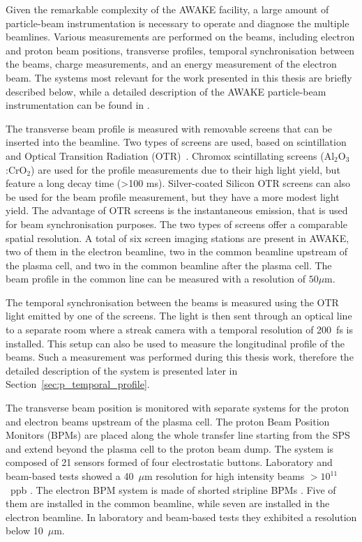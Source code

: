 Given the remarkable complexity of the AWAKE facility, a large amount of particle-beam instrumentation is necessary to operate and diagnose the multiple beamlines. Various measurements are performed on the beams, including electron and proton beam positions, transverse profiles, temporal synchronisation between the beams, charge measurements, and an energy measurement of the electron beam. The systems most relevant for the work presented in this thesis are briefly described below, while a detailed description of the AWAKE particle-beam instrumentation can be found in \cite{Mazzoni:2017gek, Gorgisyan:2649943}. 

The transverse beam profile is measured with removable screens that can be inserted into the beamline. Two types of screens are used, based on   scintillation~\cite{Behrens:2012zz} and Optical Transition Radiation (OTR)~\cite{Welsch:2006bj}. Chromox scintillating screens (Al$_2$O$_3$:CrO$_2$) are used for the profile measurements due to their high light yield, but feature a long decay time (>100 ms). Silver-coated Silicon OTR screens can also be used for the beam profile measurement, but they have a more modest light yield. The advantage of OTR screens is the instantaneous emission, that is used for beam synchronisation purposes. The two types of screens offer a comparable spatial resolution. A total of six screen imaging stations are present in AWAKE, two of them in the electron beamline, two in the common beamline upstream of the plasma cell, and two in the common beamline after the plasma cell. The beam profile in the common line can be measured with a resolution of $50\mu$m.

The temporal synchronisation between the beams is measured using the OTR light emitted by one of the screens. The light is then sent through an optical line to a separate room where a streak camera with a temporal resolution of 200~fs is installed. This setup can also be used to measure the longitudinal profile of the beams. Such a measurement was performed during this thesis work, therefore the detailed description of the system is presented later in Section~\ref{sec:p_temporal_profile}.

The transverse beam position is monitored with separate systems for the proton and electron beams upstream of the plasma cell. The proton Beam Position Monitors (BPMs) are placed along the whole transfer line starting from the SPS and extend beyond the plasma cell to the proton beam dump. The system is composed of 21 sensors formed of four electrostatic buttons. Laboratory and beam-based tests showed a 40~$\mu$m resolution for high intensity beams $>10^{11}$~ppb \cite{BarrosMarin:2018yvv}. The electron BPM system is made of shorted stripline BPMs \cite{Shengli:tipp, Liu:2019ilj}. Five of them are installed in the common beamline, while seven are installed in the electron beamline. In laboratory and beam-based tests they exhibited a resolution below 10~$\mu$m.




